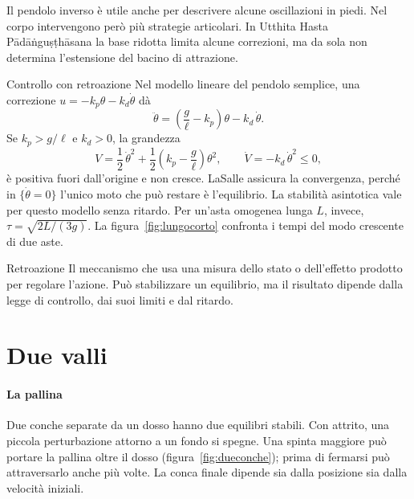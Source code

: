\documentclass[11pt,a4paper,twoside=false,headinclude,footinclude]{scrartcl}
\begin{document}
Il pendolo inverso è utile anche per descrivere alcune oscillazioni in piedi. Nel corpo intervengono però più strategie articolari. In Utthita Hasta Pādāṅguṣṭhāsana la base ridotta limita alcune correzioni, ma da sola non determina l'estensione del bacino di attrazione.

\begin{formule}{Controllo con retroazione}
Nel modello lineare del pendolo semplice, una correzione $u=-k_p\theta-k_d\dot{\theta}$ dà
\[
\ddot{\theta}=\left(\frac{g}{\ell}-k_p\right)\theta-k_d\,\dot{\theta} .
\]
Se $k_p>g/\ell$ e $k_d>0$, la grandezza
\[
V=\frac{1}{2}\,\dot{\theta}^{2}+\frac{1}{2}\left(k_p-\frac{g}{\ell}\right)\theta^{2},
\qquad
\dot V=-k_d\,\dot{\theta}^{2}\le 0 ,
\]
è positiva fuori dall'origine e non cresce. LaSalle assicura la convergenza, perché in $\{\dot{\theta}=0\}$ l'unico moto che può restare è l'equilibrio. La stabilità asintotica vale per questo modello senza ritardo. Per un'asta omogenea lunga $L$, invece, $\tau=\sqrt{2L/(3g)}$. La figura~\ref{fig:lungocorto} confronta i tempi del modo crescente di due aste.
\end{formule}

\begin{parola}{Retroazione}
Il meccanismo che usa una misura dello stato o dell'effetto prodotto per regolare l'azione. Può stabilizzare un equilibrio, ma il risultato dipende dalla legge di controllo, dai suoi limiti e dal ritardo.
\end{parola}

\section{Due valli}\label{sec:valli}

\paragraph{La pallina} Due conche separate da un dosso hanno due equilibri stabili. Con attrito, una piccola perturbazione attorno a un fondo si spegne. Una spinta maggiore può portare la pallina oltre il dosso (figura~\ref{fig:dueconche}); prima di fermarsi può attraversarlo anche più volte. La conca finale dipende sia dalla posizione sia dalla velocità iniziali.
\end{document}

